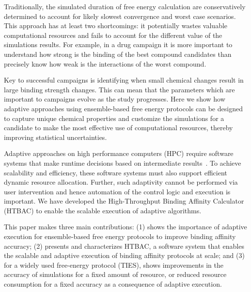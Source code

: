 Traditionally, the simulated duration of free energy calculation are
conservatively determined to account for likely slowest convergence and worst
case scenarios. This approach has at least two shortcomings: it potentially
wastes valuable computational resources  and fails to account for the
different value of the simulations results. For example, in a drug campaign it
is more important to understand how strong is the binding of the best compound
candidates than precisely know how weak is the interactions of the worst
compound.




Key to successful campaigns is identifying when small chemical changes result
in large binding strength changes. This can mean that the parameters which are
important to campaigns evolve as the study progresses. Here we show how
adaptive approaches using ensemble-based free energy protocols can be designed
to capture unique chemical properties and customize the simulations for a
candidate to make the most effective use of computational resources, thereby
improving statistical uncertainties.

Adaptive approaches on high performance computers (HPC) require software
systems that make runtime decisions based on intermediate
results~\cite{cosb18,adaptivebiomolecular}. To achieve scalability and
efficiency, these software systems must also support efficient dynamic
resource allocation. Further, such adaptivity cannot be performed via user
intervention and hence automation of the control logic and execution is
important. We have developed the High-Throughput Binding Affinity Calculator
(HTBAC) to enable the scalable execution of adaptive algorithms.

This paper makes three main contributions: (1) shows the importance of
adaptive execution for ensemble-based free energy protocols to improve binding
affinity accuracy; (2) presents and characterizes HTBAC, a software system
that enables the scalable and adaptive execution of binding affinity protocols
at scale; and (3) for a widely used free-energy protocol (TIES), shows
improvements in the accuracy of simulations for a fixed amount of resource, or
reduced resource consumption for a fixed accuracy as a consequence of adaptive
execution.


